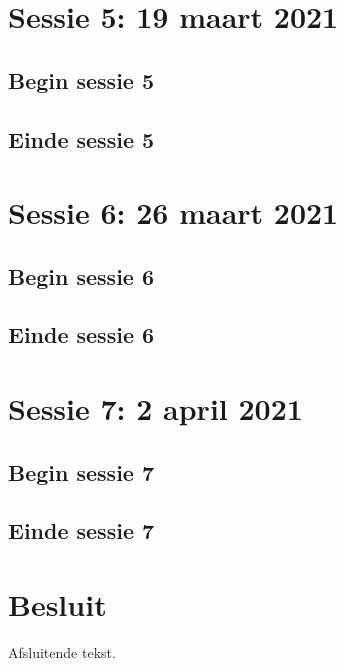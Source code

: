 \documentclass[a4paper,twoside,kulak]{kulakreport} %
\begin{document}
\chapter{Sessie 5: 19 maart 2021}
\section{Begin sessie 5}

\section{Einde sessie 5}


\chapter{Sessie 6: 26 maart 2021}
\section{Begin sessie 6}

\section{Einde sessie 6}


\chapter{Sessie 7: 2 april 2021}
\section{Begin sessie 7}

\section{Einde sessie 7}












\chapter*{Besluit}
Afsluitende tekst.
\end{document}
